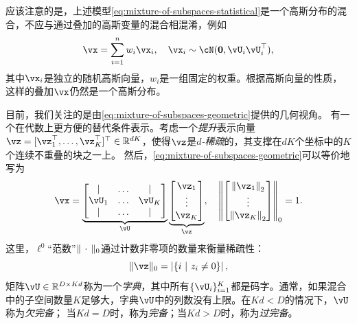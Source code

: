 \documentclass[../../book-main_zh.tex]{subfiles}
\begin{document}
\begin{remark}[高斯混合与高斯叠加]
应该注意的是，上述模型\eqref{eq:mixture-of-subspaces-statistical}是一个高斯分布的混合，不应与通过叠加的高斯变量的混合相混淆，例如
\begin{equation}
    \vx = \sum_{i=1}^n w_i \vx_i, \quad \vx_i \sim \cN(\mathbf{0}, \vU_i\vU_i^\top),
\end{equation}
其中$\vx_i$是独立的随机高斯向量，$w_i$是一组固定的权重。根据高斯向量的性质，这样的叠加$\vx$仍然是一个高斯分布。
\end{remark}

目前，我们关注的是由\eqref{eq:mixture-of-subspaces-geometric}提供的几何视角。
有一个在代数上更方便的替代条件表示。考虑一个\textit{提升}表示向量$\vz = [\vz_1^\top, \dots, \vz_K^\top]^\top \in \R^{dK}$，使得$\vz$是\textit{$d$-稀疏}的，其支撑在$dK$个坐标中的$K$个连续不重叠的块之一上。
然后，\eqref{eq:mixture-of-subspaces-geometric}可以等价地写为
\begin{equation}\label{eq:mixture-of-subspaces-dictionary-pre}
    \vx = 
    \underbrace{
    \begin{bmatrix} 
    | & \hdots & |  \\
    \vU_1 & \hdots & \vU_K  \\
    | & \hdots & | 
    \end{bmatrix} 
    }_{\vU}
    \underbrace{
    \begin{bmatrix} \vz_1 \\ \vdots \\ \vz_K \end{bmatrix}
    }_{\vz},
    \quad
    \norm*{
    \begin{bmatrix} \norm*{\vz_1}_2 \\ \vdots \\ \norm*{\vz_K}_2 \end{bmatrix}
    }_0 = 1.
\end{equation}
这里，$\ell^0$“范数”$\norm{\,\cdot\,}_0$通过计数非零项的数量来衡量稀疏性：
\begin{equation}\label{eq:ell-zero-norm}
    \norm{\vz}_0 = \abs*{\set{i \given z_i \neq 0}},
\end{equation}
矩阵$\vU \in \R^{D \times Kd}$称为一个\textit{字典}，其中所有$\{\vU_i\}_{i=1}^K$都是码字。通常，如果混合中的子空间数量$K$足够大，字典$\vU$中的列数没有上限。在$Kd < D$的情况下，$\vU$称为\textit{欠完备}；
当$Kd = D$时，称为\textit{完备}；当$Kd > D$时，称为\textit{过完备}。
\end{document}
